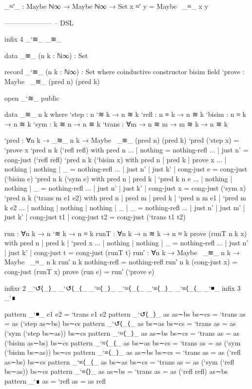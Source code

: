 \begin{code}[hide]
_≈′_ : Maybe ℕ∞ → Maybe ℕ∞ → Set
x ≈′ y = Maybe~ _≈_ x y

---------------------
-- DSL

infix 4 _`≋_ _≋_

data _≋_ (n k : ℕ∞) : Set

record _`≋_ (n k : ℕ∞) : Set where
  coinductive
  constructor bisim
  field
    `prove : Maybe~ _≋_ (pred n) (pred k)

open _`≋_ public

data _≋_ n k where
  `step  : n `≋ k → n ≋ k
  `refl  : n ≡ k → n ≋ k
  `bisim : n ≈ k → n ≋ k
  `sym   : k ≋ n → n ≋ k
  `trans : ∀{m} → n ≋ m → m ≋ k → n ≋ k

`pred : ∀{n k} → _≋_ n k → Maybe~ _≋_ (pred n) (pred k)
`pred (`step x) = `prove x
`pred {n} {k} (`refl refl) with pred n
... | nothing = nothing-refl
... | just n' = cong-just (`refl refl)
`pred {n} {k} (`bisim x) with pred n | pred k | prove x
... | nothing | nothing | _           = nothing-refl
... | just n' | just k' | cong-just e = cong-just (`bisim e)
`pred {n} {k} (`sym e) with pred n | pred k | `pred {k} {n} e
... | nothing | nothing | _           = nothing-refl
... | just n' | just k' | cong-just x = cong-just (`sym x)
`pred {n} {k} (`trans {m} e1 e2) with pred n | pred m | pred k | `pred {n} {m} e1 | `pred {m} {k} e2
... | nothing | nothing | nothing | _            |           _  = nothing-refl
... | just n' | just m' | just k' | cong-just t1 | cong-just t2 = cong-just (`trans t1 t2)

run : ∀{n k} → n `≋ k → n ≈ k
runT : ∀{n k} → n ≋ k → n ≈ k
prove (runT {n} {k} x) with pred n | pred k | `pred x
... | nothing | nothing | _ = nothing-refl
... | just n' | just k' | cong-just t = cong-just (runT t)
run′ : ∀{n k} → Maybe~ _≋_ n k → Maybe~ _≈_ n k
run′ {n} {k} nothing-refl = nothing-refl
run′ {n} {k} (cong-just x) = cong-just (runT x)
prove (run e) = run′ (`prove e)

infixr 2 _`↺⟨_⟩_ _`↺⟨_⟨_ _`≈⟨_⟩_ _`≈⟨_⟨_ _`≡⟨_⟩_ _`≡⟨_⟨_ _`◾_
infix  3 _`∎

pattern _`◾_ e1 e2 = `trans e1 e2
pattern _`↺⟨_⟩_ as as∼bs bs∼cs = `trans {as = as} (`step as∼bs) bs∼cs
pattern _`↺⟨_⟨_ as bs∼as bs∼cs = `trans {as = as} (`sym (`step bs∼as)) bs∼cs
pattern _`≈⟨_⟩_ as as∼bs bs∼cs = `trans {as = as} (`bisim as∼bs) bs∼cs
pattern _`≈⟨_⟨_ as bs∼as bs∼cs = `trans {as = as} (`sym (`bisim bs∼as)) bs∼cs
pattern _`≡⟨_⟩_ as as∼bs bs∼cs = `trans {as = as} (`refl as∼bs) bs∼cs
pattern _`≡⟨_⟨_ as bs∼as bs∼cs = `trans {as = as} (`sym (`refl bs∼as)) bs∼cs
pattern _`≡⟨⟩_  as as∼bs       = `trans {as = as} (`refl refl) as∼bs
pattern _`∎     as             = `refl  {as = as} refl


\end{code}
